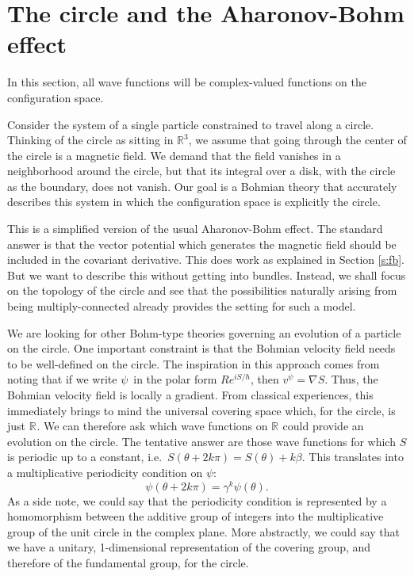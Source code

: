 \documentclass[11pt]{article}
\theoremstyle{remark}
\begin{document}
\section{The circle and the Aharonov-Bohm effect} \label{is:circ}

In this section, all wave functions will be complex-valued functions on the
configuration space. 

Consider the system of a single particle
constrained to travel along a circle. Thinking of the circle as
sitting in \ensuremath{\mathbb{R}^{3}}, we assume that going through the center of the 
circle is a
magnetic field. We demand that the field
 vanishes in a neighborhood around the circle, but
that its integral over a disk, with the circle as the boundary, does not
vanish. Our goal is a Bohmian theory that accurately describes this
system in which the configuration space is explicitly the circle. 

This is a simplified version of the usual Aharonov-Bohm effect. The
standard answer is that the vector potential which generates the
magnetic field should be included in the covariant derivative. This
does work as explained in Section {\ref{s:fb}}. But we want to describe
this without getting into bundles. Instead, we shall focus on the
topology of the circle and see that the possibilities naturally arising
from being multiply-connected already provides the setting for such a
model. 

We are looking for other Bohm-type theories governing an evolution of
a particle on the circle. One important constraint is that the Bohmian
velocity field needs to be well-defined on the circle. The inspiration
in this approach comes from 
noting that if we write \ensuremath{\psi}\ in the polar form
$Re^{iS/\ensuremath{\hbar}}$, then $v^{\ensuremath{\psi}} = \nabla S$. Thus, the Bohmian velocity
field is locally a gradient. From classical experiences, this
immediately brings to mind the universal covering space which, for the
circle, is just $\ensuremath{\mathbb{R}^{}}$. We can therefore ask which  wave functions on
$\ensuremath{\mathbb{R}^{}}$ could provide an evolution on the circle. The tentative
answer are those wave functions for which $S$ is periodic up to a constant,
i.e.\ $S( \theta + 2k\pi) = S(\theta) + k\beta$. This translates into a
multiplicative periodicity condition on $\ensuremath{\psi}$: 
\begin{equation} \label{ie:sper}
\ensuremath{\psi}(\theta + 2k\pi) = \gamma^k \ensuremath{\psi} (\theta).
\end{equation}
As a side note, we could say that the periodicity condition is
represented by a homomorphism between the additive group of integers
into the multiplicative group of the unit circle in the complex
plane. More abstractly, we could say that we have a unitary,
1-dimensional representation of
the covering group, and therefore of the fundamental group, for the
circle. 
\end{document}
